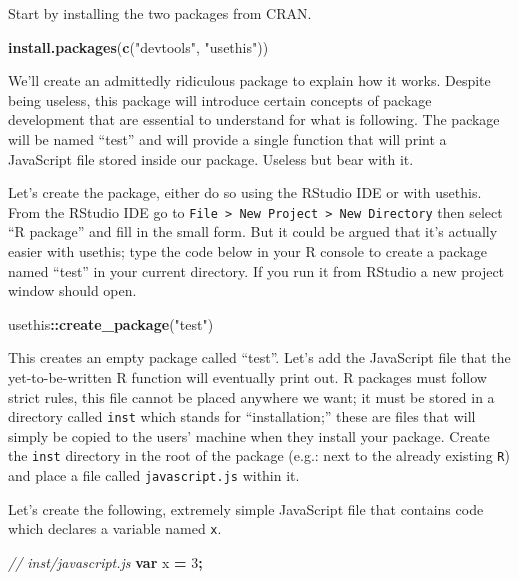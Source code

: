 \documentclass[
]{krantz}
\makeatletter
\newenvironment{Shaded}{\begin{snugshade}}{\end{snugshade}}
\newcommand{\CommentTok}[1]{\textcolor[rgb]{0.37,0.37,0.37}{\textit{#1}}}
\newcommand{\DecValTok}[1]{\textcolor[rgb]{0.06,0.06,0.06}{#1}}
\newcommand{\KeywordTok}[1]{\textcolor[rgb]{0.27,0.27,0.27}{\textbf{#1}}}
\newcommand{\NormalTok}[1]{#1}
\newcommand{\OperatorTok}[1]{\textcolor[rgb]{0.43,0.43,0.43}{\textbf{#1}}}
\newcommand{\StringTok}[1]{\textcolor[rgb]{0.5,0.5,0.5}{#1}}
\newenvironment{kframe}{%
\medskip{}
\setlength{\fboxsep}{.8em}
 \def\at@end@of@kframe{}%
 \ifinner\ifhmode%
  \def\at@end@of@kframe{\end{minipage}}%
  \begin{minipage}{\columnwidth}%
 \fi\fi%
 \def\FrameCommand##1{\hskip\@totalleftmargin \hskip-\fboxsep
 \colorbox{shadecolor}{##1}\hskip-\fboxsep
     \hskip-\linewidth \hskip-\@totalleftmargin \hskip\columnwidth}%
 \MakeFramed {\advance\hsize-\width
   \@totalleftmargin\z@ \linewidth\hsize
   \@setminipage}}%
 {\par\unskip\endMakeFramed%
 \at@end@of@kframe}
\renewenvironment{Shaded}{\begin{kframe}}{\end{kframe}}
\makeatother
\begin{document}
Start by installing the two packages from CRAN.

\begin{Shaded}
\begin{Highlighting}[]
\KeywordTok{install.packages}\NormalTok{(}\KeywordTok{c}\NormalTok{(}\StringTok{"devtools"}\NormalTok{, }\StringTok{"usethis"}\NormalTok{))}
\end{Highlighting}
\end{Shaded}

We'll create an admittedly ridiculous package to explain how it works. Despite being useless, this package will introduce certain concepts of package development that are essential to understand for what is following. The package will be named ``test'' and will provide a single function that will print a JavaScript file stored inside our package. Useless but bear with it.

Let's create the package, either do so using the RStudio IDE or with usethis. From the RStudio IDE go to \texttt{File\ \textgreater{}\ New\ Project\ \textgreater{}\ New\ Directory} then select ``R package'' and fill in the small form. But it could be argued that it's actually easier with usethis; type the code below in your R console to create a package named ``test'' in your current directory. If you run it from RStudio a new project window should open.

\begin{Shaded}
\begin{Highlighting}[]
\NormalTok{usethis}\OperatorTok{::}\KeywordTok{create\_package}\NormalTok{(}\StringTok{"test"}\NormalTok{)}
\end{Highlighting}
\end{Shaded}

This creates an empty package called ``test''. Let's add the JavaScript file that the yet-to-be-written R function will eventually print out. R packages must follow strict rules, this file cannot be placed anywhere we want; it must be stored in a directory called \texttt{inst} which stands for ``installation;'' these are files that will simply be copied to the users' machine when they install your package. Create the \texttt{inst} directory in the root of the package (e.g.: next to the already existing \texttt{R}) and place a file called \texttt{javascript.js} within it.

Let's create the following, extremely simple JavaScript file that contains code which declares a variable named \texttt{x}.

\begin{Shaded}
\begin{Highlighting}[]
\CommentTok{// inst/javascript.js}
\KeywordTok{var}\NormalTok{ x }\OperatorTok{=} \DecValTok{3}\OperatorTok{;}
\end{Highlighting}
\end{Shaded}
\end{document}
